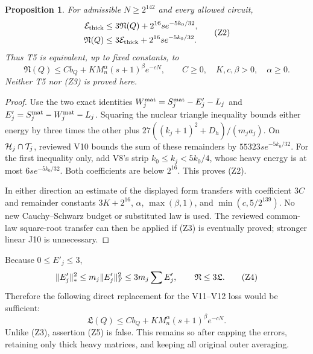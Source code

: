 \documentclass[11pt]{article}
\newtheorem{proposition}{Proposition}
\begin{document}
\begin{proposition}
For admissible $N\ge2^{142}$ and every allowed circuit,
\[
 \begin{split}
 {\cal E}_{\rm thick}
 &\le3{\mathfrak N}(Q)+2^{16}s e^{-5k_0/32},\\
 {\mathfrak N}(Q)
 &\le3{\cal E}_{\rm thick}+2^{16}s e^{-5k_0/32}.
 \end{split}                                                   \tag{Z2}
\]
Thus T5 is equivalent, up to fixed constants, to
\[
 {\mathfrak N}(Q)\le Cb_Q+K M_n^\alpha(s+1)^\beta e^{-cN},
 \qquad C\ge0,\quad K,c,\beta>0,\quad\alpha\ge0.            \tag{Z3}
\]
Neither T5 nor (Z3) is proved here.
\end{proposition}
\begin{proof}
Use the two exact identities
$W_j^{\rm mat}=S_j^{\rm mat}-E'_j-L_j$ and
$E'_j=S_j^{\rm mat}-W_j^{\rm mat}-L_j$.
Squaring the nuclear triangle inequality bounds either energy by
three times the other plus
$27((k_j+1)^2+D_h)/(m_ja_j)$.
On ${\cal H}_j\cap{\cal T}_j$, reviewed V10 bounds the sum of these
remainders by $55323s e^{-5k_0/32}$.
For the first inequality only, add V8's strip
$k_0\le k_j<5k_0/4$, whose heavy energy is at most
$6s e^{-5k_0/32}$. Both coefficients are below $2^{16}$.
This proves (Z2).

In either direction an estimate of the displayed form transfers
with coefficient $3C$ and remainder constants
$3K+2^{16}$, $\alpha$, $\max(\beta,1)$, and
$\min(c,5/2^{139})$.
No new Cauchy--Schwarz budget or substituted law is used.
The reviewed common-law square-root transfer can then be applied
if (Z3) is eventually proved; stronger linear J10 is unnecessary.
\end{proof}

Because $0\le E'_j\le3$,
\[
 \|E'_j\|_*^2\le m_j\|E'_j\|_{\rm F}^2
                  \le3m_j\sum E'_j,\qquad
                         {\mathfrak N}\le3{\mathfrak L}. \tag{Z4}
\]
Therefore the following direct replacement for the V11--V12 loss
would be sufficient:
\[
 {\mathfrak L}(Q)\le Cb_Q+
                  K M_n^\alpha(s+1)^\beta e^{-cN}.       \tag{Z5}
\]
Unlike (Z3), assertion (Z5) is false. This remains so after capping
the errors, retaining only thick heavy matrices, and keeping all
original outer averaging.
\end{document}
